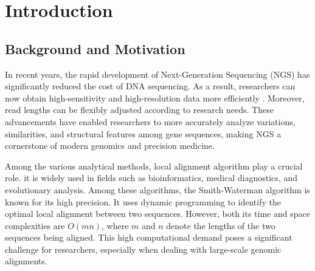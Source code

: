 \documentclass[PhD]{PHlab-thesis}
\begin{document}
\newcommand*\Acknowledgements{%
首先我要感謝我的指導教授賀保羅教授，感謝教授這兩年的細心指導與提點，透過教授的課程與會議上的教學，讓我對生醫資訊這個領域有更多的認識，也因此有這篇碩士論文的誕生。另外我要感謝已經畢業的學姊昱伶，在找教授時給我許多的幫助。還有我實驗室同學書堯、祈翰、驊軒、煜醴、 尊緯、晴文、宜靜以及考研時的戰友秉為，不論在學業上或是休閒娛樂都有你們陪伴、互相成長，讓我可以順利度過碩士生活。最後要感謝我的家人和女朋友，感謝有他們的陪伴讓我在這條路上不孤單。感謝這些貴人的出現，我才可以完成我的碩士論文。
}





\renewcommand\nomgroup[1]{%
  \item[\bfseries
  \ifstrequal{#1}{A}{General}{%
  }]}


\printnomenclature[5cm]

\newpage
\setcounter{page}{1}



\chapter{Introduction}
\section{Background and Motivation}
In recent years, the rapid development of Next-Generation Sequencing (NGS) has significantly reduced the cost of DNA sequencing. As a result, researchers can now obtain high-sensitivity and high-resolution data more efficiently \cite{NGS1}\cite{NGS2}. Moreover, read lengths can be flexibly adjusted according to research needs. These advancements have enabled researchers to more accurately analyze variations, similarities, and structural features among gene sequences, making NGS a cornerstone of modern genomics and precision medicine.

Among the various analytical methods, local alignment algorithm play a crucial role. it is widely used in fields such as bioinformatics, medical diagnostics, and evolutionary analysis. Among these algorithms, the Smith-Waterman algorithm is known for its high precision. It uses dynamic programming to identify the optimal local alignment between two sequences. However, both its time and space complexities are $O(mn)$, where $m$ and $n$ denote the lengths of the two sequences being aligned. This high computational demand poses a significant challenge for researchers, especially when dealing with large-scale genomic alignments.
\end{document}
